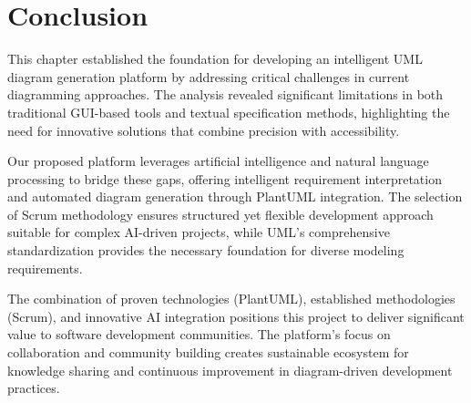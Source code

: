 \section{Conclusion}

This chapter established the foundation for developing an intelligent UML diagram generation platform by addressing critical challenges in current diagramming approaches. The analysis revealed significant limitations in both traditional GUI-based tools and textual specification methods, highlighting the need for innovative solutions that combine precision with accessibility.

Our proposed platform leverages artificial intelligence and natural language processing to bridge these gaps, offering intelligent requirement interpretation and automated diagram generation through PlantUML integration. The selection of Scrum methodology ensures structured yet flexible development approach suitable for complex AI-driven projects, while UML's comprehensive standardization provides the necessary foundation for diverse modeling requirements.

The combination of proven technologies (PlantUML), established methodologies (Scrum), and innovative AI integration positions this project to deliver significant value to software development communities. The platform's focus on collaboration and community building creates sustainable ecosystem for knowledge sharing and continuous improvement in diagram-driven development practices.
